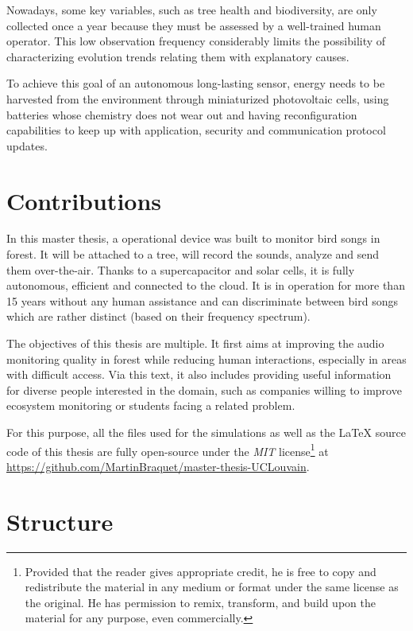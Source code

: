 \documentclass{EPL-master-thesis-covers-EN}
\begin{document}
Nowadays, some key variables, such as tree health and biodiversity, are only collected once a year because they must be assessed by a well-trained human operator. This low observation frequency considerably limits the possibility of characterizing evolution trends relating them with explanatory causes. 

To achieve this goal of an autonomous long-lasting sensor, energy needs to be harvested from the environment through miniaturized photovoltaic cells, using batteries whose chemistry does not wear out and having reconfiguration capabilities to keep up with application, security and communication protocol updates.

\section*{Contributions}

In this master thesis, a operational device was built to monitor bird songs in forest. It will be attached to a tree, will record the sounds, analyze and send them over-the-air. Thanks to a supercapacitor and solar cells, it is fully autonomous, efficient and connected to the cloud. It is in operation for more than 15 years without any human assistance and can discriminate between bird songs which are rather distinct (based on their frequency spectrum).

The objectives of this thesis are multiple. It first aims at improving the audio monitoring quality in forest while reducing human interactions, especially in areas with difficult access. Via this text, it also includes providing useful information for diverse people interested in the domain, such as companies willing to improve ecosystem monitoring or students facing a related problem.

For this purpose, all the files used for the simulations as well as the LaTeX source code of this thesis are fully open-source under the \textit{MIT} license\footnote{Provided that the reader gives appropriate credit, he is free to copy and redistribute the material in any medium or format under the same license as the original. He has permission to remix, transform, and build upon the material for any purpose, even commercially.} at \url{https://github.com/MartinBraquet/master-thesis-UCLouvain}.

\section*{Structure}
\end{document}
